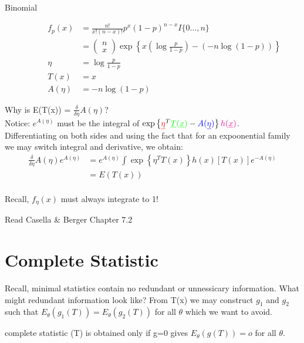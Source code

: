 \documentclass[11pt,fleqn]{book} %
\begin{document}
\begin{description}
		\item[Binomial]
		\begin{align*}
			f_p(x) &= \frac{n!}{x!(n-x)!}p^x(1-p)^{n-x}I\{0\dots,n\} \\
				&= \begin{pmatrix}  n \\  x  \end{pmatrix} \exp\left\{x(\log\frac{p}{1-p})-(-n\log(1-p)) \right\}\\
			\eta&=\log\frac{p}{1-p}\\
			T(x)&= x\\
			A(\eta)&= -n\log(1-p)
		\end{align*}

\end{description}

Why is E(T(x)) = $\frac{\delta}{\delta\eta}A(\eta)$?\\
Notice: $e^{A(\eta)}$ must be the integral of $\exp\left\{\textcolor{red}{\underline{\eta}}^T\textcolor{green}{\underline{T}(\underline{x})}-\textcolor{blue}{A(\underline{\eta})}\right\}\textcolor{magenta}{h(\underline{x})}$.\\
Differentiating on both sides and using the fact that for an expoonential family we may switch integral and derivative, we obtain:
\begin{align}
	\frac{\delta}{\delta\eta}A(\eta)e^{A(\eta)}&= e^{A(\eta)}\int\exp\left\{\eta^TT(x) \right\}h(x)[T(x)]e^{-A(\eta)}\\
	&= E(T(x))\\
\end{align}

Recall, $f_\eta (x)$ must always integrate to 1!

\begin{remark}
	Read Casella \& Berger Chapter 7.2
\end{remark}

\section{Complete Statistic}
Recall, minimal statistics contain no redundant or unnessicary information. What might redundant information look like? From T(x) we may construct $g_1$ and $g_2$ such that $E_\theta(g_1(T))=E_\theta(g_2(T))$ for all $\theta$ which we want to avoid.

\begin{definition}{complete statistic} (T) is obtained only if g=0 gives $E_\theta(g(T))=o$ for all $\theta$. 
	
\end{definition}
\end{document}
